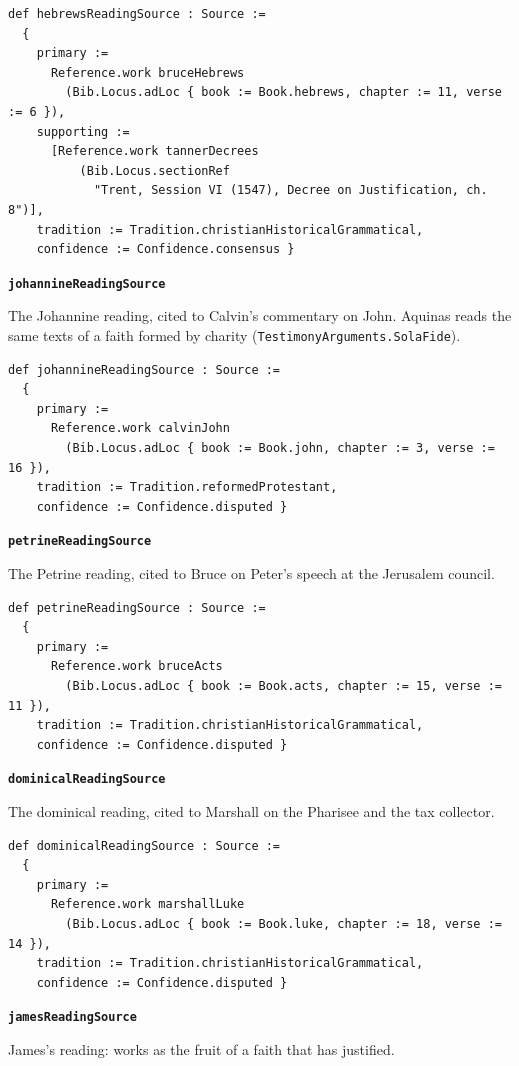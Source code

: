 \documentclass[11pt,paper=\testimonypaper,DIV=13,parskip=false]{scrartcl}
\begin{document}
{\small\begin{verbatim}
def hebrewsReadingSource : Source :=
  {
    primary :=
      Reference.work bruceHebrews
        (Bib.Locus.adLoc { book := Book.hebrews, chapter := 11, verse := 6 }),
    supporting :=
      [Reference.work tannerDecrees
          (Bib.Locus.sectionRef
            "Trent, Session VI (1547), Decree on Justification, ch. 8")],
    tradition := Tradition.christianHistoricalGrammatical,
    confidence := Confidence.consensus }
\end{verbatim}}
\par\medskip\noindent\textbf{\texttt{johannine\allowbreak{}Reading\allowbreak{}Source}}\par\nobreak\noindent
The Johannine reading, cited to Calvin’s commentary on John. Aquinas reads the same texts of a faith formed by charity (\texttt{Testimony\allowbreak{}Arguments.Sola\allowbreak{}Fide}).

{\small\begin{verbatim}
def johannineReadingSource : Source :=
  {
    primary :=
      Reference.work calvinJohn
        (Bib.Locus.adLoc { book := Book.john, chapter := 3, verse := 16 }),
    tradition := Tradition.reformedProtestant,
    confidence := Confidence.disputed }
\end{verbatim}}
\par\medskip\noindent\textbf{\texttt{petrine\allowbreak{}Reading\allowbreak{}Source}}\par\nobreak\noindent
The Petrine reading, cited to Bruce on Peter’s speech at the Jerusalem council.

{\small\begin{verbatim}
def petrineReadingSource : Source :=
  {
    primary :=
      Reference.work bruceActs
        (Bib.Locus.adLoc { book := Book.acts, chapter := 15, verse := 11 }),
    tradition := Tradition.christianHistoricalGrammatical,
    confidence := Confidence.disputed }
\end{verbatim}}
\par\medskip\noindent\textbf{\texttt{dominical\allowbreak{}Reading\allowbreak{}Source}}\par\nobreak\noindent
The dominical reading, cited to Marshall on the Pharisee and the tax collector.

{\small\begin{verbatim}
def dominicalReadingSource : Source :=
  {
    primary :=
      Reference.work marshallLuke
        (Bib.Locus.adLoc { book := Book.luke, chapter := 18, verse := 14 }),
    tradition := Tradition.christianHistoricalGrammatical,
    confidence := Confidence.disputed }
\end{verbatim}}
\par\medskip\noindent\textbf{\texttt{james\allowbreak{}Reading\allowbreak{}Source}}\par\nobreak\noindent
James’s reading: works as the fruit of a faith that has justified.
\end{document}
